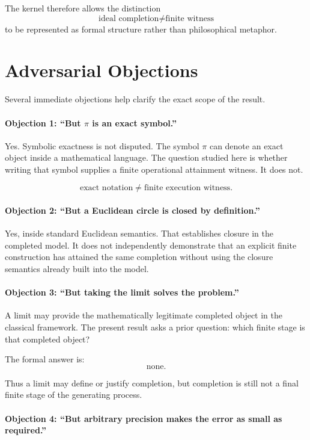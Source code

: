 \documentclass[11pt,a4paper]{article}
\begin{document}
The kernel therefore allows the distinction
\[
\boxed{
\text{ideal completion}
\neq
\text{finite witness}
}
\]
to be represented as formal structure rather than philosophical
metaphor.


\section{Adversarial Objections}

Several immediate objections help clarify the exact scope of the result.

\paragraph{Objection 1: ``But \(\pi\) is an exact symbol.''}

Yes. Symbolic exactness is not disputed. The symbol \(\pi\) can denote
an exact object inside a mathematical language. The question studied
here is whether writing that symbol supplies a finite operational
attainment witness. It does not.

\[
\text{exact notation}
\neq
\text{finite execution witness}.
\]

\paragraph{Objection 2: ``But a Euclidean circle is closed by
definition.''}

Yes, inside standard Euclidean semantics. That establishes closure in
the completed model. It does not independently demonstrate that an
explicit finite construction has attained the same completion without
using the closure semantics already built into the model.

\paragraph{Objection 3: ``But taking the limit solves the problem.''}

A limit may provide the mathematically legitimate completed object in
the classical framework. The present result asks a prior question:
which finite stage is that completed object?

The formal answer is:
\[
\boxed{\text{none}.}
\]

Thus a limit may define or justify completion, but completion is still
not a final finite stage of the generating process.

\paragraph{Objection 4: ``But arbitrary precision makes the error as
small as required.''}
\end{document}
